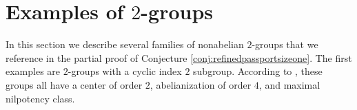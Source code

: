 \documentclass{dcthesis}
\newcommand{\defi}[1]{\textsf{#1}}
\numberwithin{equation}{section}
\theoremstyle{definition}
\theoremstyle{remark}
\newtheorem{example}[equation]{Example}
\begin{document}
{  \section{Examples of $2$-groups}{\label{sec:twogroupexamples}
    In this section we describe several families of
    nonabelian $2$-groups
    that we reference in the partial proof
    of Conjecture \ref{conj:refinedpassportsizeone}.
    The first examples are $2$-groups
    with a cyclic index $2$ subgroup.
    According to
    \cite[Theorem 1.2]{berkovich1},
    these groups all have a center of order $2$,
    abelianization of order $4$,
    and maximal nilpotency class.
}}
\end{document}
